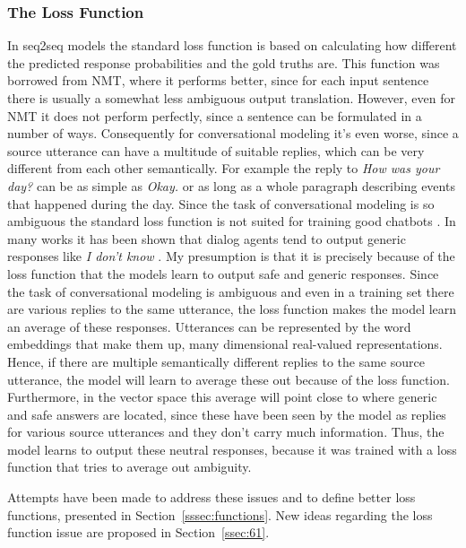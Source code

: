 \documentclass[12pt]{article}
\begin{document}
\subsubsection{The Loss Function} \label{sssec:loss_function}
In seq2seq models the standard loss function is based on calculating how different the predicted response probabilities and the gold truths are. This function was borrowed from NMT, where it performs better, since for each input sentence there is usually a somewhat less ambiguous output translation. However, even for NMT it does not perform perfectly, since a sentence can be formulated in a number of ways. Consequently for conversational modeling it's even worse, since a source utterance can have a multitude of suitable replies, which can be very different from each other semantically. For example the reply to \textit{How was your day?} can be as simple as \textit{Okay.} or as long as a whole paragraph describing events that happened during the day. Since the task of conversational modeling is so ambiguous the standard loss function is not suited for training good chatbots \cite{Vinyals:2015,Li:2015}. In many works it has been shown that dialog agents tend to output generic responses like \textit{I don't know} \cite{Vinyals:2015,Serban:2015,Li:2015,Li:2016,Jena:2017}. My presumption is that it is precisely because of the loss function that the models learn to output safe and generic responses. Since the task of conversational modeling is ambiguous and even in a training set there are various replies to the same utterance, the loss function makes the model learn an average of these responses. Utterances can be represented by the word embeddings that make them up, many dimensional real-valued representations. Hence, if there are multiple semantically different replies to the same source utterance, the model will learn to average these out because of the loss function. Furthermore, in the vector space this average will point close to where generic and safe answers are located, since these have been seen by the model as replies for various source utterances and they don't carry much information. Thus, the model learns to output these neutral responses, because it was trained with a loss function that tries to average out ambiguity.

Attempts have been made to address these issues and to define better loss functions, presented in Section~\ref{sssec:functions}. New ideas regarding the loss function issue are proposed in Section~\ref{ssec:61}.
\end{document}
